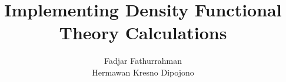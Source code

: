 \documentclass[a4paper,11pt]{extbook}
\begin{document}
\title{Implementing Density Functional Theory Calculations}
\author{Fadjar Fathurrahman \\
Hermawan Kresno Dipojono}
\maketitle

\frontmatter

%


%

\tableofcontents

\mainmatter










\appendix







\printindex
\end{document}
